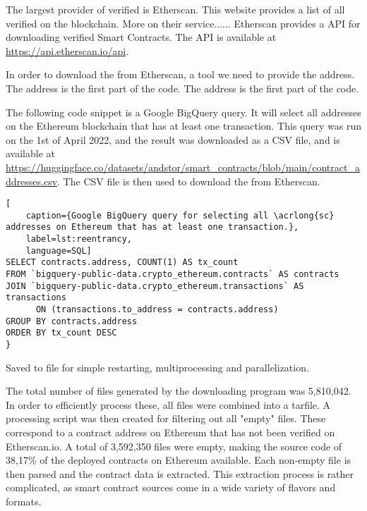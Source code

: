 The largest provider of verified  is Etherscan. This website provides a list of all verified  on the blockchain. More on their service...... Etherscan provides a API for downloading verified Smart Contracts. The API is available at \url{https://api.etherscan.io/api}.

In order to download the  from Etherscan, a tool we need to provide the  address. The address is the first part of the  code. The address is the first part of the  code.

The following code snippet is a Google BigQuery query. It will select all  addresses on the Ethereum blockchain that has at least one transaction. This query was run on the 1st of April 2022, and the result was downloaded as a CSV file, and is available at \url{https://huggingface.co/datasets/andstor/smart_contracts/blob/main/contract_addresses.csv}. The CSV file is then used to download the  from Etherscan.

\begin{lstlisting}[
    caption={Google BigQuery query for selecting all \acrlong{sc} addresses on Ethereum that has at least one transaction.},
    label=lst:reentrancy,
    language=SQL]
SELECT contracts.address, COUNT(1) AS tx_count
FROM `bigquery-public-data.crypto_ethereum.contracts` AS contracts
JOIN `bigquery-public-data.crypto_ethereum.transactions` AS transactions 
      ON (transactions.to_address = contracts.address)
GROUP BY contracts.address
ORDER BY tx_count DESC
}
\end{lstlisting}

Saved to file for simple restarting, multiprocessing and parallelization.

The total number of files generated by the downloading program was 5,810,042. In order to efficiently process these, all files were combined into a tarfile. A processing script was then created for filtering out all "empty" files. These correspond to a contract address on Ethereum that has not been verified on Etherscan.io. A total of 3,592,350 files were empty, making the source code of 38,17\% of the deployed contracts on Ethereum available. Each non-empty file is then parsed and the contract data is extracted. This extraction process is rather complicated, as smart contract sources come in a wide variety of flavors and formats.

